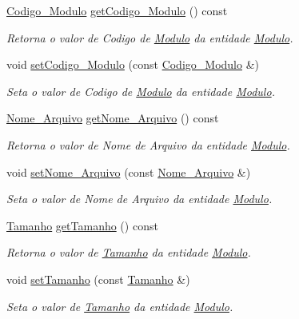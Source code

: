 \begin{DoxyCompactItemize}
\item 
\hyperlink{class_codigo___modulo}{\-Codigo\-\_\-\-Modulo} \hyperlink{class_modulo_a966939d6761114d5030ca10c816302ac}{get\-Codigo\-\_\-\-Modulo} () const 
\begin{DoxyCompactList}\small\item\em \-Retorna o valor de \-Codigo de \hyperlink{class_modulo}{\-Modulo} da entidade \hyperlink{class_modulo}{\-Modulo}. \end{DoxyCompactList}\item 
void \hyperlink{class_modulo_a8b41e4725c45aa47b5454008f517c392}{set\-Codigo\-\_\-\-Modulo} (const \hyperlink{class_codigo___modulo}{\-Codigo\-\_\-\-Modulo} \&)
\begin{DoxyCompactList}\small\item\em \-Seta o valor de \-Codigo de \hyperlink{class_modulo}{\-Modulo} da entidade \hyperlink{class_modulo}{\-Modulo}. \end{DoxyCompactList}\item 
\hyperlink{class_nome___arquivo}{\-Nome\-\_\-\-Arquivo} \hyperlink{class_modulo_af4662253c0b78f248b02e3925a5d102c}{get\-Nome\-\_\-\-Arquivo} () const 
\begin{DoxyCompactList}\small\item\em \-Retorna o valor de \-Nome de \-Arquivo da entidade \hyperlink{class_modulo}{\-Modulo}. \end{DoxyCompactList}\item 
void \hyperlink{class_modulo_a52d8354c7eb434f05ea76fbbcf715f9b}{set\-Nome\-\_\-\-Arquivo} (const \hyperlink{class_nome___arquivo}{\-Nome\-\_\-\-Arquivo} \&)
\begin{DoxyCompactList}\small\item\em \-Seta o valor de \-Nome de \-Arquivo da entidade \hyperlink{class_modulo}{\-Modulo}. \end{DoxyCompactList}\item 
\hyperlink{class_tamanho}{\-Tamanho} \hyperlink{class_modulo_a64213272a845de661228d9117560d405}{get\-Tamanho} () const 
\begin{DoxyCompactList}\small\item\em \-Retorna o valor de \hyperlink{class_tamanho}{\-Tamanho} da entidade \hyperlink{class_modulo}{\-Modulo}. \end{DoxyCompactList}\item 
void \hyperlink{class_modulo_ac39f3f24b46921700cd9231b2b67ddd9}{set\-Tamanho} (const \hyperlink{class_tamanho}{\-Tamanho} \&)
\begin{DoxyCompactList}\small\item\em \-Seta o valor de \hyperlink{class_tamanho}{\-Tamanho} da entidade \hyperlink{class_modulo}{\-Modulo}. \end{DoxyCompactList}\end{DoxyCompactItemize}


